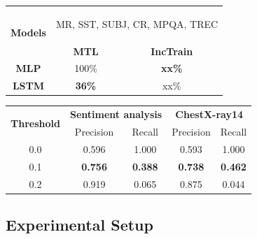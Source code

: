 \begin{table}
\begin{minipage}[t]{.40\textwidth}
	\centering
	\begin{tabular}{c c c}
		\toprule
		\multirow{2}{*}{{\bf Models}} & \multicolumn{2}{c}{\begin{minipage}{1.1in}\begin{center}
		MR, SST, SUBJ, CR, MPQA, TREC\end{center}\end{minipage}} \\
		\cmidrule(lr){2-3}
		& {\bf MTL} & {\bf IncTrain} \\
		\midrule
		{\bf MLP}  & 100\% & \textbf{xx\%} \\
		{\bf LSTM} & \textbf{36\%} & xx\% \\
		\bottomrule
		\end{tabular}
	\vspace{0.1in}
	\label{tab:taskonomy}
	\vspace{-0.2in}
\end{minipage}%
\quad
\begin{minipage}[t]{.58\textwidth}
	\centering
  \begin{tabular}{c c c c c}
	\toprule
		\multirow{2}{*}{{\bf Threshold}}  & \multicolumn{2}{c}{{\bf Sentiment
		analysis}} & \multicolumn{2}{c}{{\bf ChestX-ray14}} \\
		& Precision &  Recall & Precision &  Recall \\
		\cmidrule(lr){1-1} \cmidrule(lr){2-3} \cmidrule(lr){4-5}
		0.0 & 0.596 & 1.000 & 0.593 & 1.000 \\
		0.1 & \textbf{0.756} & \textbf{0.388} & \textbf{0.738} & \textbf{0.462} \\
		0.2 & 0.919 & 0.065 & 0.875 & 0.044 \\
	\bottomrule
	\end{tabular}
	\vspace{0.1in}
	\label{tab:mtl_better_than_stl}
	\vspace{-0.2in}
\end{minipage}
\end{table}

\subsection{Experimental Setup}

